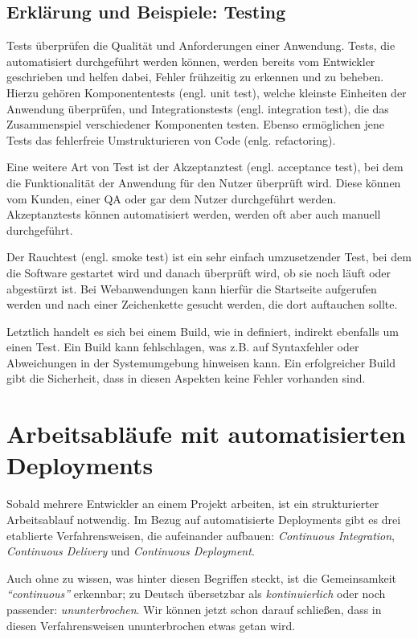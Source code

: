 \subsection{Erklärung und Beispiele: Testing}
\label{subsec:def-testing}

Tests überprüfen die Qualität und Anforderungen einer Anwendung. Tests, die automatisiert durchgeführt werden können, werden bereits vom Entwickler geschrieben und helfen dabei, Fehler frühzeitig zu erkennen und zu beheben. Hierzu gehören Komponententests (engl. unit test), welche kleinste Einheiten der Anwendung überprüfen, und Integrationstests (engl. integration test), die das Zusammenspiel verschiedener Komponenten testen. Ebenso ermöglichen jene Tests das fehlerfreie Umstrukturieren von Code (enlg. refactoring). \citep[104f]{Wolff2016}

Eine weitere Art von Test ist der Akzeptanztest (engl. acceptance test), bei dem die Funktionalität der Anwendung für den Nutzer überprüft wird. Diese können vom Kunden, einer \ac{QA} oder gar dem Nutzer durchgeführt werden. Akzeptanztests können automatisiert werden, werden oft aber auch manuell durchgeführt. \citep[86]{Humble2010}

Der Rauchtest (engl. smoke test) ist ein sehr einfach umzusetzender Test, bei dem die Software gestartet wird und danach überprüft wird, ob sie noch läuft oder abgestürzt ist. Bei Webanwendungen kann hierfür die Startseite aufgerufen werden und nach einer Zeichenkette gesucht werden, die dort auftauchen sollte. \citep[117]{Humble2010}

Letztlich handelt es sich bei einem Build, wie in  definiert, indirekt ebenfalls um einen Test. Ein Build kann fehlschlagen, was z.B. auf Syntaxfehler oder Abweichungen in der Systemumgebung hinweisen kann. Ein erfolgreicher Build gibt die Sicherheit, dass in diesen Aspekten keine Fehler vorhanden sind.

\section{Arbeitsabläufe mit automatisierten Deployments}

Sobald mehrere Entwickler an einem Projekt arbeiten, ist ein strukturierter Arbeitsablauf notwendig. Im Bezug auf automatisierte Deployments gibt es drei etablierte Verfahrensweisen, die aufeinander aufbauen: \emph{Continuous Integration}, \emph{Continuous Delivery} und \emph{Continuous Deployment}.

Auch ohne zu wissen, was hinter diesen Begriffen steckt, ist die Gemeinsamkeit \emph{``continuous''} erkennbar; zu Deutsch übersetzbar als \emph{kontinuierlich} oder noch passender: \emph{ununterbrochen}. Wir können jetzt schon darauf schließen, dass in diesen Verfahrensweisen ununterbrochen etwas getan wird.

